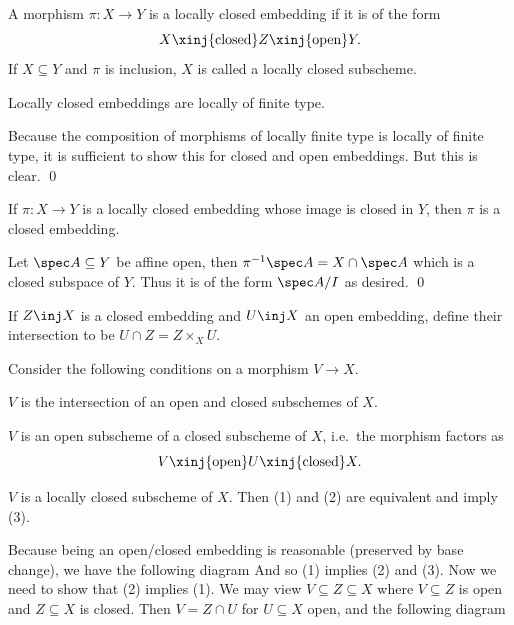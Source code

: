 \bdefn

    A morphism $\pi\colon X\to Y$ is a {\emphcolor locally closed embedding} if it is of the form
    $$ X \xinj{\text{closed}} Z \xinj{\text{open}} Y . $$
    If $X\subseteq Y$ and $\pi$ is inclusion, $X$ is called a {\emphcolor locally closed subscheme}.

\edefn

\bprop

    Locally closed embeddings are locally of finite type.

\eprop

\bproof

    Because the composition of morphisms of locally finite type is locally of finite type, it is sufficient
    to show this for closed and open embeddings.
    But this is clear.
    \qed

\eproof

\bprop[name={lcembcl}]

    If $\pi\colon X\to Y$ is a locally closed embedding whose image is closed in $Y$, then $\pi$ is a closed
    embedding.

\eprop

\bproof

    Let $\spec A\subseteq Y$ be affine open, then $\pi^{-1}\spec A=X\cap\spec A$ which is a closed subspace of
    $Y$.
    Thus it is of the form $\spec A/I$ as desired.
    \qed

\eproof

If $Z\inj X$ is a closed embedding and $U\inj X$ an open embedding, define their intersection to be
$U\cap Z=Z\times_XU$.

\bprop

    Consider the following conditions on a morphism $V\to X$.
    \benum
        \item $V$ is the intersection of an open and closed subschemes of $X$.
        \item $V$ is an open subscheme of a closed subscheme of $X$, i.e.\ the morphism factors as
        $$ V \xinj{\text{open}} U \xinj{\text{closed}} X . $$
        \item $V$ is a locally closed subscheme of $X$.
    \eenum
    Then (1) and (2) are equivalent and imply (3).

\eprop

\bproof

    Because being an open/closed embedding is reasonable (preserved by base change), we have the following
    diagram
    And so (1) implies (2) and (3).
    Now we need to show that (2) implies (1).
    We may view $V\subseteq Z\subseteq X$ where $V\subseteq Z$ is open and $Z\subseteq X$ is closed.
    Then $V=Z\cap U$ for $U\subseteq X$ open, and the following diagram

